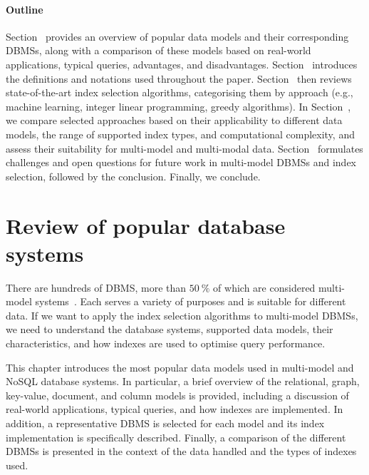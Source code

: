 \paragraph{Outline} Section~ provides an overview of popular data models and their corresponding DBMSs, along with a comparison of these models based on real-world applications, typical queries, advantages, and disadvantages. Section~ introduces the definitions and notations used throughout the paper. Section~ then reviews state-of-the-art index selection algorithms, categorising them by approach (e.g., machine learning, integer linear programming, greedy algorithms). In Section~, we compare selected approaches based on their applicability to different data models, the range of supported index types, and computational complexity, and assess their suitability for multi-model and multi-modal data. Section~ formulates challenges and open questions for future work in multi-model DBMSs and index selection, followed by the conclusion. Finally, we conclude.


\section{Review of popular database systems}

There are hundreds of DBMS, more than $50~\%$ of which are considered multi-model systems~\citep{DBEngines2024}. Each serves a variety of purposes and is suitable for different data. If we want to apply the index selection algorithms to multi-model DBMSs, we need to understand the database systems, supported data models, their characteristics, and how indexes are used to optimise query performance.

This chapter introduces the most popular data models used in multi-model and NoSQL database systems. In particular, a brief overview of the relational, graph, key-value, document, and column models is provided, including a discussion of real-world applications, typical queries, and how indexes are implemented. In addition, a representative DBMS is selected for each model and its index implementation is specifically described.
Finally, a comparison of the different DBMSs is presented in the context of the data handled and the types of indexes used.

